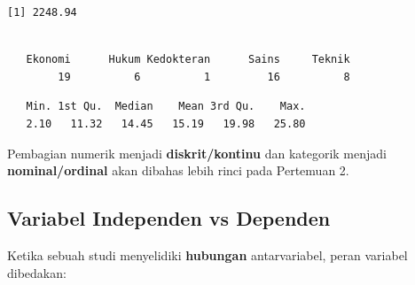\documentclass[
  indonesian,
  letterpaper,
]{book}
\newenvironment{Shaded}{\begin{snugshade}}{\end{snugshade}}
\newcommand{\FunctionTok}[1]{\textcolor[rgb]{0.28,0.35,0.67}{#1}}
\newcommand{\NormalTok}[1]{\textcolor[rgb]{0.00,0.23,0.31}{#1}}
\newcommand{\SpecialCharTok}[1]{\textcolor[rgb]{0.37,0.37,0.37}{#1}}
\begin{document}
\begin{verbatim}
[1] 2248.94
\end{verbatim}

\begin{Shaded}
\end{Shaded}

\begin{verbatim}

   Ekonomi      Hukum Kedokteran      Sains     Teknik 
        19          6          1         16          8 
\end{verbatim}

\begin{Shaded}
\end{Shaded}

\begin{verbatim}
   Min. 1st Qu.  Median    Mean 3rd Qu.    Max. 
   2.10   11.32   14.45   15.19   19.98   25.80 
\end{verbatim}

Pembagian numerik menjadi \textbf{diskrit/kontinu} dan kategorik menjadi
\textbf{nominal/ordinal} akan dibahas lebih rinci pada Pertemuan 2.

\subsection{Variabel Independen vs
Dependen}\label{variabel-independen-vs-dependen}

Ketika sebuah studi menyelidiki \textbf{hubungan} antarvariabel, peran
variabel dibedakan:
\end{document}
